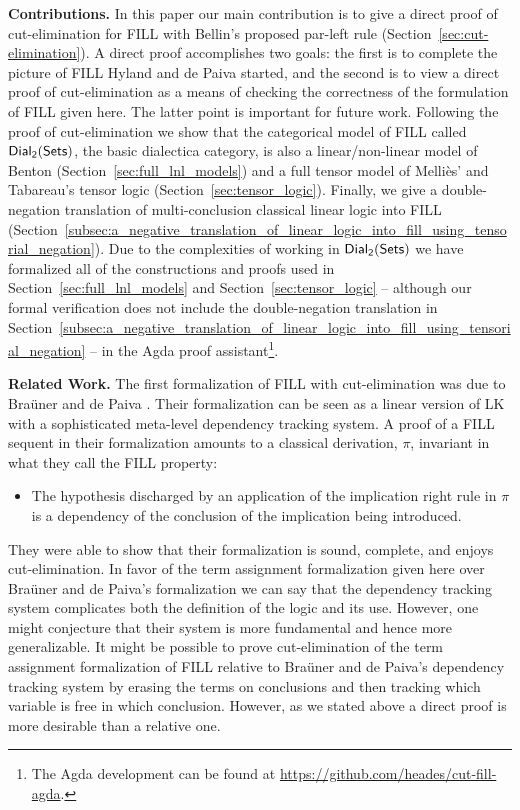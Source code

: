\textbf{Contributions.} In this paper our main contribution is to give
a direct proof of cut-elimination for FILL with Bellin's proposed
par-left rule (Section~\ref{sec:cut-elimination}).  A direct proof
accomplishes two goals: the first is to complete the picture of FILL
Hyland and de Paiva started, and the second is to view a direct proof
of cut-elimination as a means of checking the correctness of the
formulation of FILL given here.  The latter point is important for
future work.  Following the proof of cut-elimination we show that the
categorical model of FILL called $\mathsf{Dial_2}(\mathsf{Sets})$, the basic dialectica
category, is also a linear/non-linear model of Benton
(Section~\ref{sec:full_lnl_models}) and a full tensor model of
Melli\`es' and Tabareau's tensor logic
(Section~\ref{sec:tensor_logic}). Finally, we give a double-negation
translation of multi-conclusion classical linear logic into FILL
(Section~\ref{subsec:a_negative_translation_of_linear_logic_into_fill_using_tensorial_negation}).
Due to the complexities of working in $\mathsf{Dial_2}(\mathsf{Sets})$ we have formalized all
of the constructions and proofs used in
Section~\ref{sec:full_lnl_models} and Section~\ref{sec:tensor_logic}
-- although our formal verification does not include the
double-negation translation in
Section~\ref{subsec:a_negative_translation_of_linear_logic_into_fill_using_tensorial_negation}
-- in the Agda proof assistant\footnote{The Agda development can be
  found at \url{https://github.com/heades/cut-fill-agda}.}.

\textbf{Related Work.} The first formalization of FILL with
cut-elimination was due to Bra\"uner and de Paiva \cite{Brauner:1998}.
Their formalization can be seen as a linear version of LK with a
sophisticated meta-level dependency tracking system.  A proof of a
FILL sequent in their formalization amounts to a classical derivation,
$\pi$, invariant in what they call the FILL property:
\begin{center}
  \begin{itemize}
  \item The hypothesis discharged by an application of the implication
    right rule in $\pi$ is a dependency of the conclusion of the
    implication being introduced.
  \end{itemize}
\end{center}
They were able to show that their formalization is sound, complete,
and enjoys cut-elimination.  In favor of the term assignment
formalization given here over Bra\"uner and de Paiva's formalization
we can say that the dependency tracking system complicates both the
definition of the logic and its use.  However, one might conjecture
that their system is more fundamental and hence more generalizable.
It might be possible to prove cut-elimination of the term assignment
formalization of FILL relative to Bra\"uner and de Paiva's dependency
tracking system by erasing the terms on conclusions and then tracking
which variable is free in which conclusion.  However, as we stated
above a direct proof is more desirable than a relative one.

